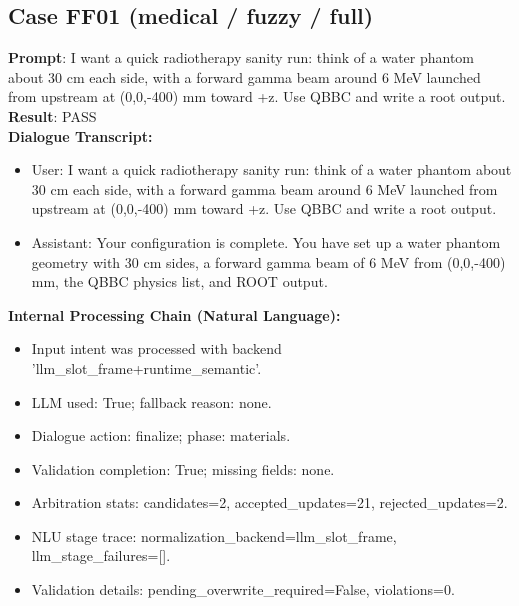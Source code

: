 \documentclass[11pt]{ctexart}
\begin{document}
\subsection{Case FF01 (medical / fuzzy / full)}
\textbf{Prompt}: I want a quick radiotherapy sanity run: think of a water phantom about 30 cm each side, with a forward gamma beam around 6 MeV launched from upstream at (0,0,-400) mm toward +z. Use QBBC and write a root output.\\
\textbf{Result}: PASS\\
\textbf{Dialogue Transcript:}
\begin{itemize}
\item User: I want a quick radiotherapy sanity run: think of a water phantom about 30 cm each side, with a forward gamma beam around 6 MeV launched from upstream at (0,0,-400) mm toward +z. Use QBBC and write a root output.
\item Assistant: Your configuration is complete. You have set up a water phantom geometry with 30 cm sides, a forward gamma beam of 6 MeV from (0,0,-400) mm, the QBBC physics list, and ROOT output.
\end{itemize}
\textbf{Internal Processing Chain (Natural Language):}
\begin{itemize}
\item Input intent was processed with backend 'llm\_slot\_frame+runtime\_semantic'.
\item LLM used: True; fallback reason: none.
\item Dialogue action: finalize; phase: materials.
\item Validation completion: True; missing fields: none.
\item Arbitration stats: candidates=2, accepted\_updates=21, rejected\_updates=2.
\item NLU stage trace: normalization\_backend=llm\_slot\_frame, llm\_stage\_failures=[].
\item Validation details: pending\_overwrite\_required=False, violations=0.
\end{itemize}
\end{document}
